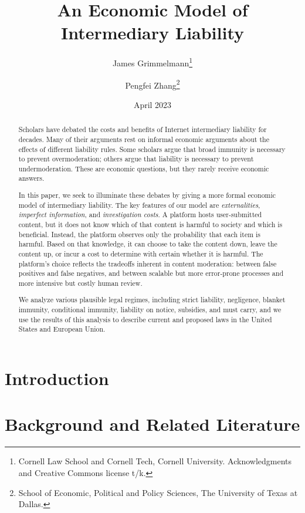 \documentclass[openbib,12pt]{article}  %
\title{An Economic Model of Intermediary Liability}
\author{James Grimmelmann\footnote{Cornell Law School and Cornell Tech, Cornell University. Acknowledgments and Creative Commons license t/k. }
\and Pengfei Zhang\footnote{School of Economic, Political and Policy Sciences, The University of Texas at Dallas.}}
\date{April 2023}
\begin{document}
\maketitle

\begin{abstract}
\noindent 
Scholars have debated the costs and benefits of Internet intermediary liability for decades. Many of their arguments rest on informal economic arguments about the effects of different liability rules. Some scholars argue that broad immunity is necessary to prevent overmoderation; others argue that liability is necessary to prevent undermoderation. These are economic questions, but they rarely receive economic answers.

In this paper, we seek to illuminate these debates by giving a more formal economic model of intermediary liability. The key features of our model are \emph{externalities}, \emph{imperfect information}, and \emph{investigation costs}. A platform hosts user-submitted content, but it does not know which of that content is harmful to society and which is beneficial. Instead, the platform observes only the probability that each item is harmful. Based on that knowledge, it can choose to take the content down, leave the content up, or incur a cost to determine with certain whether it is harmful. The platform's choice reflects the tradeoffs inherent in content moderation: between false positives and false negatives, and between scalable but more error-prone processes and more intensive but costly human review.

We analyze various plausible legal regimes, including strict liability, negligence, blanket immunity, conditional immunity, liability on notice, subsidies, and must carry, and we use the results of this analysis to describe current and proposed laws in the United States and European Union.

\vspace{0in}

\end{abstract}

\newpage
\tableofcontents

\newpage

\section*{Introduction}\label{EMIL_Section:intro}


\section{Background and Related Literature}\label{EMIL_Section:inst}





\end{document}
